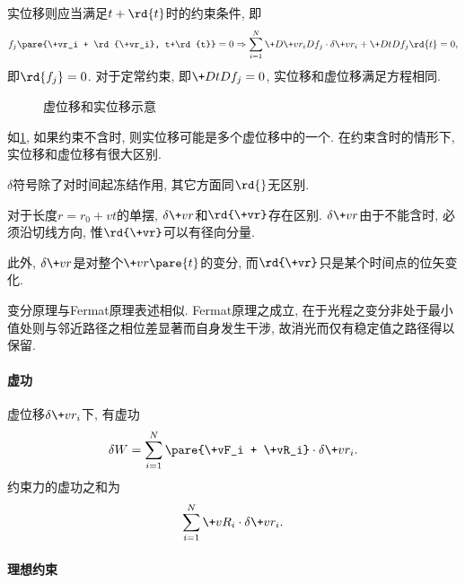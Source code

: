 \documentclass{ctexart}
\begin{document}
实位移则应当满足$t+\rd{t}$时的约束条件, 即
\[ f_j\pare{\+vr_i + \rd{\+vr_i}, t+\rd{t}} = 0 \Rightarrow \sum_{i=1}^N \+D{\+vr_i}D{f_j}\cdot\delta\+vr_i + \+DtD{f_j}\rd{t} = 0, \]
即$\rd{f_j} = 0$. 对于定常约束, 即$\displaystyle \+DtD{f_j} = 0$, 实位移和虚位移满足方程相同.
\begin{figure}[ht]
    \centering
    \caption{虚位移和实位移示意}
    \label{fig:虚位移和实位移示意}
\end{figure}
如\cref{fig:虚位移和实位移示意}, 如果约束不含时, 则实位移可能是多个虚位移中的一个. 在约束含时的情形下, 实位移和虚位移有很大区别.
\begin{finale}
    $\delta$符号除了对时间起冻结作用, 其它方面同$\rd{}$无区别.
\end{finale}
\begin{sample}
    \begin{ex}
        对于长度$r=r_0+vt$的单摆, $\delta \+vr$和$\rd{\+vr}$存在区别. $\delta \+vr$由于不能含时, 必须沿切线方向, 惟$\rd{\+vr}$可以有径向分量.
    \end{ex}
    \begin{remark}
        此外, $\delta \+vr$是对整个$\+vr\pare{t}$的变分, 而$\rd{\+vr}$只是某个时间点的位矢变化.
    \end{remark}
\end{sample}
\begin{remark}
    变分原理与Fermat原理表述相似. Fermat原理之成立, 在于光程之变分非处于最小值处则与邻近路径之相位差显著而自身发生干涉, 故消光而仅有稳定值之路径得以保留.
\end{remark}


\paragraph{虚功} %
\label{par:虚功}

虚位移$\delta\+vr_i$下, 有虚功
\[ \delta W = \sum_{i=1}^N\pare{\+vF_i + \+vR_i} \cdot\delta\+vr_i. \]
约束力的虚功之和为
\begin{equation}
    \label{eq:约束力的虚功之和}
    \sum_{i=1}^N \+vR_i\cdot\delta\+vr_i. 
\end{equation}


\paragraph{理想约束} %
\label{par:理想约束}
\end{document}
